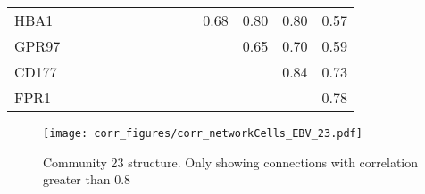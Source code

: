 \begin{longtable}{lrrrrrrrrrrrrr}
HBA1    &              &               &              &              &             &           &            &            &            &        0.68 &        0.80 &       0.80 &         0.57 \\
GPR97   &              &               &              &              &             &           &            &            &            &             &        0.65 &       0.70 &         0.59 \\
CD177   &              &               &              &              &             &           &            &            &            &             &             &       0.84 &         0.73 \\
FPR1    &              &               &              &              &             &           &            &            &            &             &             &            &         0.78 \\
\end{longtable}


\begin{figure}[h!]
\centering
\texttt{[image: corr\_figures/corr\_networkCells\_EBV\_23.pdf]}
\caption{Community 23 structure. Only showing connections with correlation greater than 0.8}
\end{figure}




